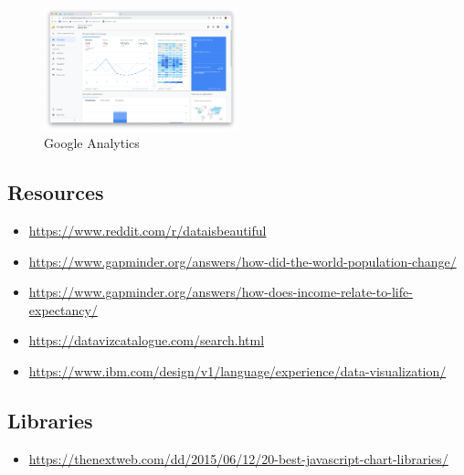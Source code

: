 \documentclass{article}
\begin{document}
\begin{figure}[H]
    \centering
    \includegraphics[width=0.5\textwidth]{dv-interactie1.png}
    \caption{Google Analytics}
\end{figure}




\subsection{Resources}

\begin{itemize}
    \item \url{https://www.reddit.com/r/dataisbeautiful}
    \item \url{https://www.gapminder.org/answers/how-did-the-world-population-change/}
    \item \url{https://www.gapminder.org/answers/how-does-income-relate-to-life-expectancy/}
    \item \url{https://datavizcatalogue.com/search.html}
    \item \url{https://www.ibm.com/design/v1/language/experience/data-visualization/}
\end{itemize}

\subsection{Libraries}

\begin{itemize}
    \item \url{https://thenextweb.com/dd/2015/06/12/20-best-javascript-chart-libraries/}
\end{itemize}
\end{document}
